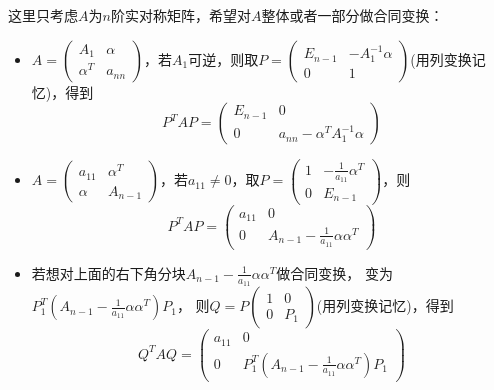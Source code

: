 \begin{theorem}[分块矩阵合同]
  这里只考虑$A$为$n$阶实对称矩阵，希望对$A$整体或者一部分做合同变换：
  \begin{itemize}
  \item $A = \left(
      \begin{array}{cc}
        A_1&\alpha\\
        \alpha^T& a_{nn}
      \end{array}
    \right)$，若$A_1$可逆，则取$P = \left(
      \begin{array}{cc}
        E_{n-1}&-A_1^{-1}\alpha\\
        0&1
      \end{array}
    \right)$(用列变换记忆)，得到
    \begin{equation*}
      P^T AP = \left(
        \begin{array}{cc}
          E_{n-1}&0\\
          0&a_{nn} - \alpha^T A_1^{-1}\alpha
        \end{array}
      \right)
    \end{equation*}
  \item $A = \left(
      \begin{array}{cc}
        a_{11}&\alpha^T\\
        \alpha&A_{n-1}
      \end{array}
    \right)$，若$a_{11} \neq 0$，取$P = \left(
      \begin{array}{cc}
        1&- \frac{1}{a_{11}}\alpha^T\\
        0&E_{n-1}
      \end{array}
    \right)$，则
    \begin{equation*}
      P^TAP = \left(
        \begin{array}{cc}
          a_{11}&0\\
          0&A_{n-1} - \frac{1}{a_{11}}\alpha \alpha^T
        \end{array}
      \right)
    \end{equation*}
  \item 若想对上面的右下角分块$A_{n-1} - \frac{1}{a_{11}}\alpha \alpha^T$做合同变换，
    变为$P_1^T \left( A_{n-1} - \frac{1}{a_{11}}\alpha \alpha^T\right)P_1$，
    则$Q = P \left(
      \begin{array}{cc}
        1&0\\
        0&P_1
      \end{array}
    \right)$(用列变换记忆)，得到
    \begin{equation*}
      Q^TAQ = \left(
        \begin{array}{cc}
          a_{11}&0\\
          0&P_1^T \left( A_{n-1} - \frac{1}{a_{11}}\alpha \alpha^T \right) P_1
        \end{array}
      \right)
    \end{equation*}
  \end{itemize}
\end{theorem}


